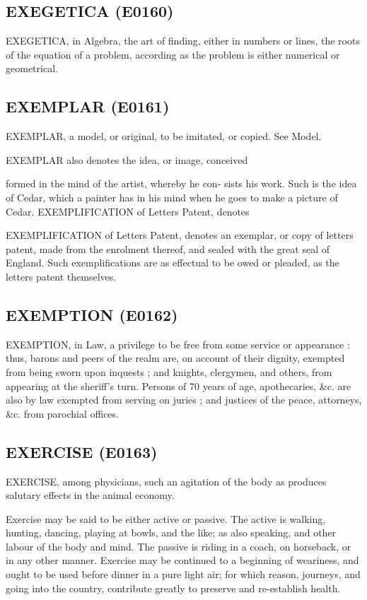\documentclass{article}
\begin{document}
\subsection*{EXEGETICA (E0160)}
EXEGETICA, in Algebra, the art of finding, either in numbers or lines, the roots of the equation of a problem, according as the problem is either numerical or geometrical.

\subsection*{EXEMPLAR (E0161)}
EXEMPLAR, a model, or original, to be imitated, or copied. See Model.

EXEMPLAR also denotes the idea, or image, conceived

formed in the mind of the artist, whereby he con-
sists his work. Such is the idea of Cedar, which a
painter has in his mind when he goes to make a picture
of Cedar.
EXEMPLIFICATION of Letters Patent, denotes

EXEMPLIFICATION of Letters Patent, denotes an exemplar, or copy of letters patent, made from the enrolment thereof, and sealed with the great seal of England. Such exemplifications are as effectual to be owed or pleaded, as the letters patent themselves.

\subsection*{EXEMPTION (E0162)}
EXEMPTION, in Law, a privilege to be free from some service or appearance : thus, barons and peers of the realm are, on account of their dignity, exempted from being sworn upon inquests ; and knights, clergymen, and others, from appearing at the sheriff's turn. Persons of 70 years of age, apothecaries, \&c. are also by law exempted from serving on juries ; and justices of the peace, attorneys, \&c. from parochial offices.

\subsection*{EXERCISE (E0163)}
EXERCISE, among physicians, such an agitation of the body as produces salutary effects in the animal economy.

Exercise may be said to be either active or passive. The active is walking, hunting, dancing, playing at bowls, and the like; as also speaking, and other labour of the body and mind. The passive is riding in a coach, on horseback, or in any other manner. Exercise may be continued to a beginning of weariness, and ought to be used before dinner in a pure light air; for which reason, journeys, and going into the country, contribute greatly to preserve and re-establish health.
\end{document}

